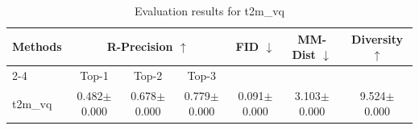 \begin{table}[h]
\centering
\begin{tabular}{l ccc ccc}
\toprule
\multirow{2}{*}{\textbf{Methods}} & \multicolumn{3}{c}{\textbf{R-Precision $\uparrow$}} & \multirow{2}{*}{\textbf{FID $\downarrow$}} & \multirow{2}{*}{\textbf{MM-Dist $\downarrow$}} & \multirow{2}{*}{\textbf{Diversity $\uparrow$}} \\
\cmidrule(lr){2-4}
& Top-1 & Top-2 & Top-3 & & & \\
\midrule
t2m_vq & 0.482$\pm$0.000 & 0.678$\pm$0.000 & 0.779$\pm$0.000 & 0.091$\pm$0.000 & 3.103$\pm$0.000 & 9.524$\pm$0.000 \\
\bottomrule
\end{tabular}
\caption{Evaluation results for t2m_vq}
\label{tab:results_t2m_vq}
\end{table}
